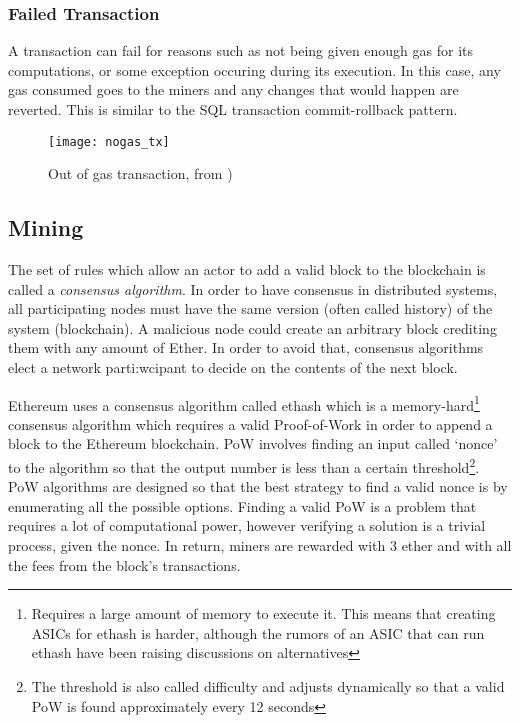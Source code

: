 \subsubsection{Failed Transaction}
A transaction can fail for reasons such as not being given enough gas for its computations, or some exception occuring during its execution. In this case, any gas consumed goes to the miners and any changes that would happen are reverted. This is similar to the SQL transaction commit-rollback pattern.

\begin{figure}[H]
    \centering
    \texttt{[image: nogas\_tx]}
    \caption{Out of gas transaction, from \cite{preethi})}
    \label{fig:nogas_tx}
\end{figure}

\subsection{Mining}
The set of rules which allow an actor to add a valid block to the blockchain is called a \textit{consensus algorithm}. In order to have consensus in distributed systems, all participating nodes must have the same version (often called history) of the system (blockchain). A malicious node could create an arbitrary block crediting them with any amount of Ether. In order to avoid that, consensus algorithms elect a network parti:wcipant to decide on the contents of the next block. 

Ethereum uses a consensus algorithm called ethash\cite{ethash} which is a memory-hard\footnote{Requires a large amount of memory to execute it. This means that creating ASICs for ethash is harder, although the rumors of an ASIC that can run ethash have been raising discussions on alternatives\cite{asicfork}} consensus algorithm which requires a valid Proof-of-Work in order to append a block to the Ethereum blockchain. PoW involves finding an input called `nonce' to the algorithm so that the output number is less than a certain threshold\footnote{The threshold is also called difficulty and adjusts dynamically so that a valid PoW is found approximately every 12 seconds}. PoW algorithms are designed so that the best strategy to find a valid nonce is by enumerating all the possible options. Finding a valid PoW is a problem that requires a lot of computational power, however verifying a solution is a trivial process, given the nonce. In return, miners are rewarded with 3 ether and with all the fees from the block's transactions.

